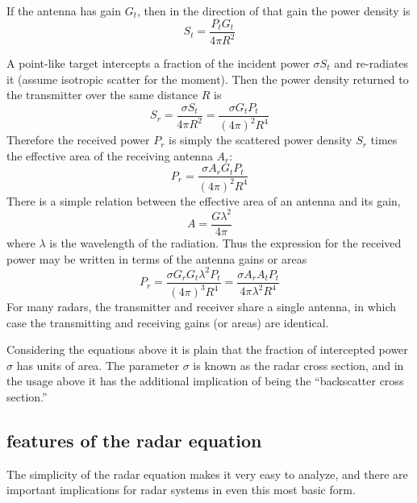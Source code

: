 If the antenna has gain $G_t$, then in the direction of that gain the
power density is
\begin{equation}
S_t = \frac{P_t G_t}{4\pi R^2}
\end{equation}

A point-like target intercepts a fraction of the incident power
$\sigma S_t$ and re-radiates it (assume isotropic scatter for the moment).
Then the power density returned to the transmitter over the same
distance $R$ is
\begin{equation}
S_r = \frac{\sigma S_t}{4 \pi R^2} = \frac{\sigma G_t P_t}{(4\pi)^2R^4}
\end{equation}
Therefore the received power $P_r$ is simply the scattered power
density $S_r$ times the effective area of the receiving antenna $A_r$:
\begin{equation}
P_r = \frac{\sigma A_r G_t P_t}{(4\pi)^2R^4}
\end{equation}
There is a simple relation between the effective area of an antenna
and its gain,
\begin{equation}
A = \frac{G \lambda^2}{4\pi}
\end{equation}
where $\lambda$ is the wavelength of the radiation.  Thus the
expression for the received power may be written in terms of the
antenna gains or areas
\begin{equation}
P_r = \frac{\sigma G_r G_t \lambda^2 P_t}{(4\pi)^3 R^4}
    = \frac{\sigma A_r A_t P_t}{4\pi  \lambda^2 R^4}
\end{equation}
For many radars, the transmitter and receiver share a single antenna,
in which case the transmitting and receiving gains (or areas) are
identical.

Considering the equations above it is plain that the fraction of
intercepted power $\sigma$ has units of area.  The parameter $\sigma$
is known as the radar cross section, and in the usage above it has the
additional implication of being the ``backscatter cross section.''

\subsection{features of the radar equation}

The simplicity of the radar equation makes it very easy to analyze,
and there are important implications for radar systems in even this
most basic form.


